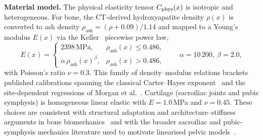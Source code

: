 \documentclass[11pt]{article}
\begin{document}
\noindent\textbf{Material model.}
The physical elasticity tensor $C_{\rm phys}(x)$ is isotropic and heterogeneous.
For bone, the CT-derived hydroxyapatite density $\rho(x)$ is converted to ash density $\rho_{\mathrm{ash}}=(\rho+0.09)/1.14$ and mapped to a Young's modulus $E(x)$ via the Keller~\citep{Keller1994} piecewise power law,
\begin{equation}
E(x)=\begin{cases}
2398\,\mathrm{MPa}, & \rho_{\mathrm{ash}}(x)\le 0.486,\\[2pt]
\alpha\,\rho_{\mathrm{ash}}(x)^{\beta}, & \rho_{\mathrm{ash}}(x)>0.486,
\end{cases}
\qquad \alpha=10\,200,\ \beta=2.0,
\label{eq:keller}
\end{equation}
with Poisson's ratio $\nu=0.3$.
This family of density--modulus relations brackets published calibrations spanning the classical Carter--Hayes exponent~\citep{CarterHayes1977} and the site-dependent regressions of Morgan et al.~\citep{Morgan2003Trabecular}.
Cartilage (sacroiliac joints and pubic symphysis) is homogeneous linear elastic with $E=1.0$\,MPa and $\nu=0.45$.
These choices are consistent with structural adaptation and architecture--stiffness arguments in bone biomechanics~\citep{Frost1987,Huiskes1987,FarrKhosla2015,Zebaze2010Porosity} and with the broader sacroiliac and pubic-symphysis mechanics literature used to motivate linearised pelvic models~\citep{Snijders1993,Vleeming2012,Goode2008}.
\end{document}
